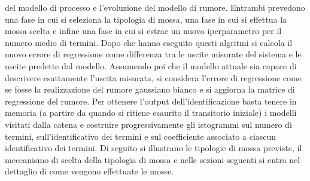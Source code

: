 del modello di processo e l’evoluzione del modello di rumore.
Entrambi prevedono una fase in cui si seleziona la tipologia di mossa, una fase in cui
si effettua la mossa scelta e infine una fase in cui si estrae un nuovo iperparametro
per il numero medio di termini.
Dopo che hanno eseguito questi algritmi si calcola il nuovo errore di regressione come
differenza tra le uscite misurate del sistema e le uscite predette dal modello.
Assumendo poi che il modello attuale sia capace di descrivere esattamente l’uscita
misurata, si considera l’errore di regressione come se fosse la realizzazione del rumore gaussiano bianco e si aggiorna la matrice di regressione del rumore.
Per ottenere l’output dell’identificazione basta tenere in memoria (a partire da
quando si ritiene esaurito il transitorio iniziale) i modelli visitati dalla catena e
costruire progressivamente gli istogrammi sul numero di termini, sull’identificativo
dei termini e sul coefficiente associato a ciascun identificativo dei termini. Di seguito
si illustrano le tipologie di mossa previste, il meccanismo di scelta della tipologia di
mossa e nelle sezioni seguenti si entra nel dettaglio di come vengono effettuate le
mosse.
